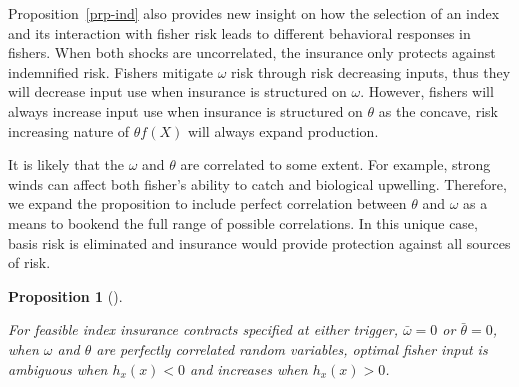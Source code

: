\documentclass[
  letterpaper,
  DIV=11,
  numbers=noendperiod]{scrartcl}
\theoremstyle{plain}
\theoremstyle{plain}
\newtheorem{proposition}{Proposition}[section]
\theoremstyle{remark}
\begin{document}
Proposition~\ref{prp-ind} also provides new insight on how the selection
of an index and its interaction with fisher risk leads to different
behavioral responses in fishers. When both shocks are uncorrelated, the
insurance only protects against indemnified risk. Fishers mitigate
\(\omega\) risk through risk decreasing inputs, thus they will decrease
input use when insurance is structured on \(\omega\). However, fishers
will always increase input use when insurance is structured on
\(\theta\) as the concave, risk increasing nature of \(\theta f(X)\)
will always expand production.

It is likely that the \(\omega\) and \(\theta\) are correlated to some
extent. For example, strong winds can affect both fisher's ability to
catch and biological upwelling. Therefore, we expand the proposition to
include perfect correlation between \(\theta\) and \(\omega\) as a means
to bookend the full range of possible correlations. In this unique case,
basis risk is eliminated and insurance would provide protection against
all sources of risk.

\begin{proposition}[]\protect\hypertarget{prp-corr}{}\label{prp-corr}

For feasible index insurance contracts specified at either trigger,
\(\bar\omega=0\) or \(\bar\theta=0\), when \(\omega\) and \(\theta\) are
perfectly correlated random variables, optimal fisher input is ambiguous
when \(h_x(x)<0\) and increases when \(h_x(x)>0\).

\end{proposition}
\end{document}
